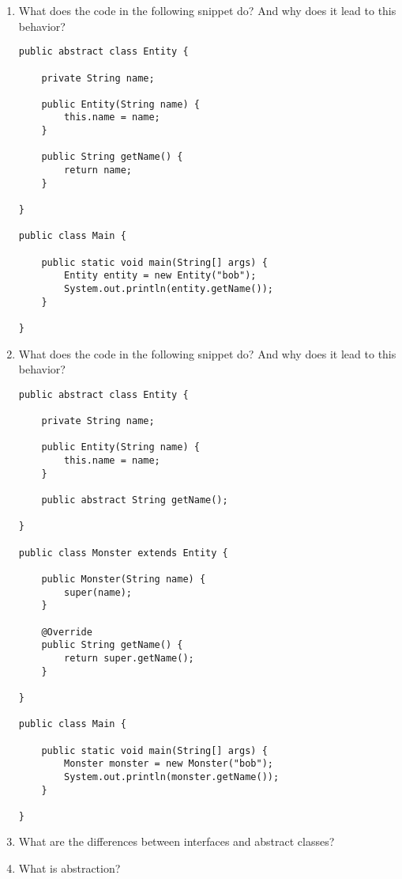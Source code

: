 \documentclass[12pt,letterpaper]{article}
\begin{document}
\begin{enumerate}
\begin{enumerate}
\end{enumerate}

\newpage

\item
What does the code in the following snippet do? And why does it lead to this behavior?
\begin{lstlisting}
public abstract class Entity {

    private String name;

    public Entity(String name) {
        this.name = name;
    }

    public String getName() {
        return name;
    }

}

public class Main {

    public static void main(String[] args) {
        Entity entity = new Entity("bob");
        System.out.println(entity.getName());
    }

}
\end{lstlisting}

\newpage

\item
What does the code in the following snippet do? And why does it lead to this behavior?
\begin{lstlisting}
public abstract class Entity {

    private String name;

    public Entity(String name) {
        this.name = name;
    }

    public abstract String getName();

}

public class Monster extends Entity {

    public Monster(String name) {
        super(name);
    }

    @Override
    public String getName() {
        return super.getName();
    }

}

public class Main {

    public static void main(String[] args) {
        Monster monster = new Monster("bob");
        System.out.println(monster.getName());
    }

}
\end{lstlisting}

\item
What are the differences between interfaces and abstract classes?

\item
What is abstraction?

\end{enumerate}
\end{document}
